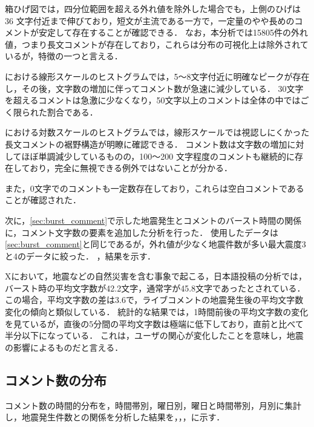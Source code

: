 箱ひげ図では，四分位範囲を超える外れ値を除外した場合でも，上側のひげは 36 文字付近まで伸びており，短文が主流である一方で，一定量のやや長めのコメントが安定して存在することが確認できる．
なお，本分析では15805件の外れ値，つまり長文コメントが存在しており，これらは分布の可視化上は除外されているが，特徴の一つと言える．

における線形スケールのヒストグラムでは，5〜8文字付近に明確なピークが存在し，その後，文字数の増加に伴ってコメント数が急速に減少している．
30文字を超えるコメントは急激に少なくなり，50文字以上のコメントは全体の中ではごく限られた割合である．

における対数スケールのヒストグラムでは，線形スケールでは視認しにくかった 長文コメントの裾野構造が明瞭に確認できる．
コメント数は文字数の増加に対してほぼ単調減少しているものの，100〜200 文字程度のコメントも継続的に存在しており，完全に無視できる例外ではないことが分かる．

また，0文字でのコメントも一定数存在しており，これらは空白コメントであることが確認された．

次に，\ref{sec:burst_comment}で示した地震発生とコメントのバースト時間の関係に，コメント文字数の要素を追加した分析を行った．
使用したデータは\ref{sec:burst_comment}と同じであるが，外れ値が少なく地震件数が多い最大震度3と4のデータに絞った．
，結果を示す．

\clearpage




Xにおいて，地震などの自然災害を含む事象で起こる，日本語投稿の分析では，バースト時の平均文字数が42.2文字，通常字が45.8文字であったとされている\cite{Mizunuma2014TwitterBursts}．
この場合，平均文字数の差は3.6で，ライブコメントの地震発生後の平均文字数変化の傾向と類似している．
統計的な結果では，1時間前後の平均文字数の変化を見ているが，直後の5分間の平均文字数は極端に低下しており，直前と比べて半分以下になっている．
これは，ユーザの関心が変化したことを意味し，地震の影響によるものだと言える．


\subsection{コメント数の分布}

コメント数の時間的分布を，時間帯別，曜日別，曜日と時間帯別，月別に集計し，地震発生件数との関係を分析した結果を，，，に示す．


